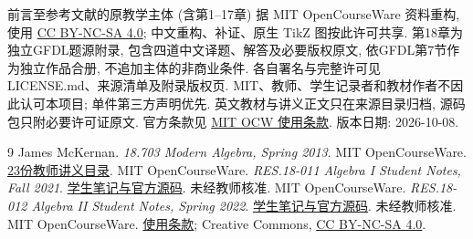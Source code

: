 前言至参考文献的原教学主体 (含第1--17章) 据 MIT OpenCourseWare 资料重构, 使用 \href{https://creativecommons.org/licenses/by-nc-sa/4.0/}{CC BY-NC-SA 4.0}; 中文重构、补证、原生 TikZ 图按此许可共享. 第18章为独立GFDL题源附录, 包含四道中文译题、解答及必要版权原文, 依GFDL第7节作为独立作品合册, 不追加主体的非商业条件. 各自署名与完整许可见 LICENSE.md、来源清单及附录版权页. MIT、教师、学生记录者和教材作者不因此认可本项目; 单件第三方声明优先. 英文教材与讲义正文只在来源目录归档, 源码包只附必要许可证原文. 官方条款见 \href{https://ocw.mit.edu/pages/privacy-and-terms-of-use/}{MIT OCW 使用条款}. 版本日期: 2026-10-08.
\clearpage

\clearpage
\originalcontents
\clearpage
\mainmatter

















\begingroup
\renewcommand{\addcontentsline}[3]{}
\begin{thebibliography}{9}
 James McKernan. \textit{18.703 Modern Algebra, Spring 2013}. MIT OpenCourseWare. \href{https://ocw.mit.edu/courses/18-703-modern-algebra-spring-2013/pages/lecture-notes/}{23份教师讲义目录}.
 MIT OpenCourseWare. \textit{RES.18-011 Algebra I Student Notes, Fall 2021}. \href{https://ocw.mit.edu/courses/res-18-011-algebra-i-student-notes-fall-2021/pages/student-notes/}{学生笔记与官方源码}. 未经教师核准.
 MIT OpenCourseWare. \textit{RES.18-012 Algebra II Student Notes, Spring 2022}. \href{https://ocw.mit.edu/courses/res-18-012-algebra-ii-student-notes-spring-2022/pages/student-notes/}{学生笔记与官方源码}. 未经教师核准.
 MIT OpenCourseWare. \href{https://ocw.mit.edu/pages/privacy-and-terms-of-use/}{使用条款}; Creative Commons, \href{https://creativecommons.org/licenses/by-nc-sa/4.0/}{CC BY-NC-SA 4.0}.
\end{thebibliography}
\endgroup




